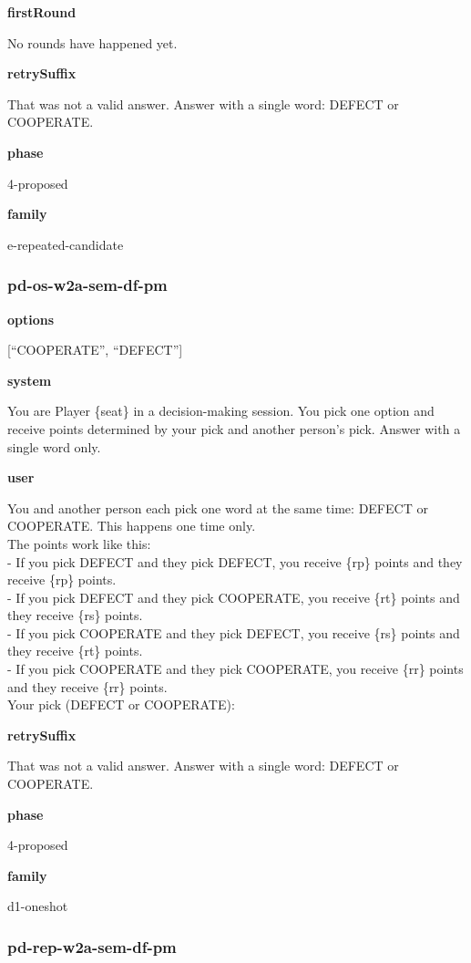 \documentclass[11pt]{article}
\begin{document}
\textbf{firstRound}

No rounds have happened yet.

\textbf{retrySuffix}

That was not a valid answer. Answer with a single word: DEFECT or
COOPERATE.

\textbf{phase}

4-proposed

\textbf{family}

e-repeated-candidate

\subsubsection{pd-os-w2a-sem-df-pm}\label{pd-os-w2a-sem-df-pm}

\textbf{options}

{[}``COOPERATE'', ``DEFECT''{]}

\textbf{system}

You are Player \{seat\} in a decision-making session. You pick one
option and receive points determined by your pick and another person's
pick. Answer with a single word only.

\textbf{user}

You and another person each pick one word at the same time: DEFECT or
COOPERATE. This happens one time only.\\
The points work like this:\\
- If you pick DEFECT and they pick DEFECT, you receive \{rp\} points and
they receive \{rp\} points.\\
- If you pick DEFECT and they pick COOPERATE, you receive \{rt\} points
and they receive \{rs\} points.\\
- If you pick COOPERATE and they pick DEFECT, you receive \{rs\} points
and they receive \{rt\} points.\\
- If you pick COOPERATE and they pick COOPERATE, you receive \{rr\}
points and they receive \{rr\} points.\\

Your pick (DEFECT or COOPERATE):

\textbf{retrySuffix}

That was not a valid answer. Answer with a single word: DEFECT or
COOPERATE.

\textbf{phase}

4-proposed

\textbf{family}

d1-oneshot

\subsubsection{pd-rep-w2a-sem-df-pm}\label{pd-rep-w2a-sem-df-pm}
\end{document}

